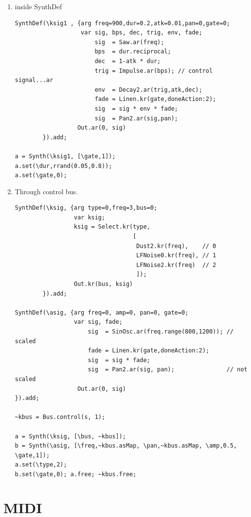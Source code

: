 \begin{enumerate}
\def\labelenumi{\arabic{enumi}.}
\tightlist
\item inside SynthDef
\begin{lstlisting}[frame=single] 
SynthDef(\ksig1 , {arg freq=900,dur=0.2,atk=0.01,pan=0,gate=0;
                   var sig, bps, dec, trig, env, fade;
                       sig  = Saw.ar(freq);
                       bps  = dur.reciprocal;
                       dec  = 1-atk * dur;
                       trig = Impulse.ar(bps); // control signal...ar
                       env  = Decay2.ar(trig,atk,dec);
                       fade = Linen.kr(gate,doneAction:2);
                       sig  = sig * env * fade;
                       sig  = Pan2.ar(sig,pan);
	              Out.ar(0, sig)
        }).add;

a = Synth(\ksig1, [\gate,1]);
a.set(\dur,rrand(0.05,0.8));	
a.set(\gate,0);
\end{lstlisting}

\item Through control bus.
\begin{lstlisting}[frame=single] 
SynthDef(\ksig, {arg type=0,freq=3,bus=0;
                 var ksig;
                 ksig = Select.kr(type,
                                  [
                                   Dust2.kr(freq),    // 0
                                   LFNoise0.kr(freq), // 1
                                   LFNoise2.kr(freq)  // 2
                                   ]);
                 Out.kr(bus, ksig)              
        }).add;

SynthDef(\asig, {arg freq=0, amp=0, pan=0, gate=0;
                 var sig, fade;
                     sig  = SinOsc.ar(freq.range(800,1200)); // scaled
                     fade = Linen.kr(gate,doneAction:2);
                     sig  = sig * fade;
                     sig  = Pan2.ar(sig, pan);               // not scaled
	              Out.ar(0, sig)
}).add;

~kbus = Bus.control(s, 1);

a = Synth(\ksig, [\bus, ~kbus]);
b = Synth(\asig, [\freq,~kbus.asMap, \pan,~kbus.asMap, \amp,0.5, \gate,1]);
a.set(\type,2);
b.set(\gate,0); a.free; ~kbus.free;
\end{lstlisting}
\end{enumerate}

\section{MIDI}\label{midi}

